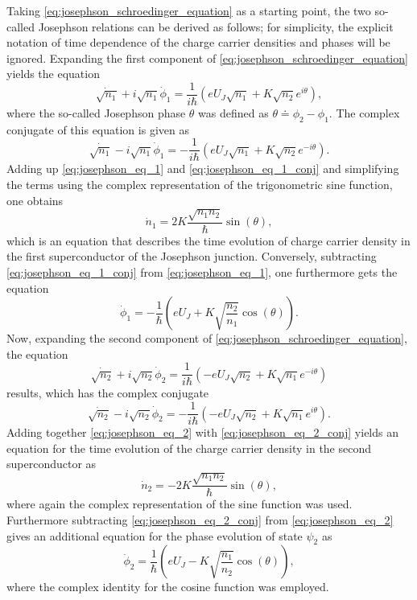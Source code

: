 \documentclass{report}
\numberwithin{tm}{section}
\begin{document}
Taking \cref{eq:josephson_schroedinger_equation} as a starting point, the two so-called Josephson relations can be derived as follows; for simplicity, the explicit notation of time dependence of the charge carrier densities and phases will be ignored. Expanding the first component of \cref{eq:josephson_schroedinger_equation} yields the equation \begin{equation}\label{eq:josephson_eq_1}
	\dot{\sqrt{n_1}} + i\sqrt{n_1}\dot{\phi}_1 = \frac{1}{i\hbar}\left(eU_J\sqrt{n_1}+ K\sqrt{n_2}e^{i\theta}\right),
\end{equation} where the so-called Josephson phase $\theta$ was defined as $\theta \doteq \phi_2-\phi_1$. The complex conjugate of this equation is given as \begin{equation}\label{eq:josephson_eq_1_conj}
\dot{\sqrt{n_1}} - i\sqrt{n_1}\dot{\phi}_1 = -\frac{1}{i\hbar}\left(eU_J\sqrt{n_1}+ K\sqrt{n_2}e^{-i\theta}\right).
\end{equation} Adding up \cref{eq:josephson_eq_1} and \cref{eq:josephson_eq_1_conj} and simplifying the terms using the complex representation of the trigonometric sine function, one obtains \begin{equation}
\dot{n}_1 = 2K\frac{\sqrt{n_1n_2}}{\hbar}\sin(\theta),
\end{equation} which is an equation that describes the time evolution of charge carrier density in the first superconductor of the Josephson junction. Conversely, subtracting \cref{eq:josephson_eq_1_conj} from \cref{eq:josephson_eq_1}, one furthermore gets the equation \begin{equation}
\dot{\phi}_1 = -\frac{1}{\hbar}\left(eU_J + K\sqrt{\frac{n_2}{n_1}}\cos(\theta)\right).
\end{equation} Now, expanding the second component of \cref{eq:josephson_schroedinger_equation}, the equation \begin{equation}\label{eq:josephson_eq_2}
\dot{\sqrt{n_2}} + i\sqrt{n_2}\dot{\phi}_2 = \frac{1}{i\hbar}\left(-eU_J\sqrt{n_2} + K\sqrt{n_1}e^{-i\theta}\right)
\end{equation} results, which has the complex conjugate \begin{equation}\label{eq:josephson_eq_2_conj}
\dot{\sqrt{n_2}} - i\sqrt{n_2}\dot{\phi}_2 = -\frac{1}{i\hbar}\left(-eU_J\sqrt{n_2} + K\sqrt{n_1}e^{i\theta}\right).
\end{equation} Adding together \cref{eq:josephson_eq_2} with \cref{eq:josephson_eq_2_conj} yields an equation for the time evolution of the charge carrier density in the second superconductor as \begin{equation}
\dot{n}_2 = -2K\frac{\sqrt{n_1n_2}}{\hbar}\sin(\theta),
\end{equation} where again the complex representation of the sine function was used. Furthermore subtracting \cref{eq:josephson_eq_2_conj} from \cref{eq:josephson_eq_2} gives an additional equation for the phase evolution of state $\psi_2$ as \begin{equation}
\dot{\phi}_2 = \frac{1}{\hbar}\left(eU_J-K\sqrt{\frac{n_1}{n_2}}\cos(\theta)\right),
\end{equation} where the complex identity for the cosine function was employed.
\end{document}
